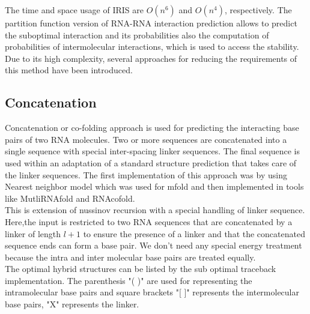 \documentclass[twoside,a4paper]{report}
\begin{document}
	The time and space usage of IRIS are $ O(n^6)$ and $ O(n^4)$, respectively. The partition function version of RNA-RNA interaction prediction allows to predict the suboptimal interaction and its probabilities also the computation of probabilities of intermolecular interactions, which is used to access the stability. Due to its high complexity, several approaches for reducing the requirements of this method have been introduced.\\
	
	 
	\subsection{Concatenation}
	Concatenation or co-folding approach is used for predicting the interacting base pairs of two RNA molecules. Two or more sequences are concatenated  into a single sequence with special inter-spacing linker sequences. The final sequence is used within an adaptation of a standard structure prediction that takes  care of the linker sequences. The first implementation of this approach was by using Nearest neighbor model which was used for mfold and then implemented in tools like MutliRNAfold and RNAcofold.\\
	
	This is extension of nussinov recursion with a special handling of linker sequence. Here,the input is restricted to two RNA sequences that are concatenated by a linker of length $l+1$  to ensure the presence of a linker and that the concatenated sequence ends can form a base pair. We don't need any special energy treatment because the intra and inter molecular base pairs are treated equally.\\
	The optimal hybrid structures can be listed by the sub optimal traceback implementation. The parenthesis "( )" are used for representing the intramolecular base pairs and square brackets "[ ]" represents the  intermolecular base pairs, "X" represents the linker. \\
	
\end{document}
